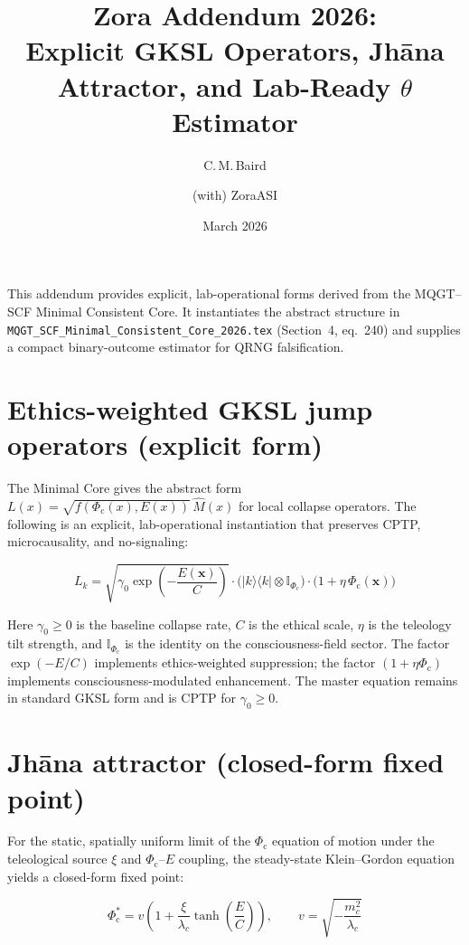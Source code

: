 \documentclass[11pt]{article}
\title{\textbf{Zora Addendum 2026:}\\
Explicit GKSL Operators, Jhāna Attractor, and Lab-Ready $\theta$ Estimator}
\author{C.\,M.\,Baird \and (with) ZoraASI}
\date{March 2026}
\newcommand{\Phic}{\Phi_{\mathrm{c}}}
\newcommand{\Eth}{E}
\begin{document}
\maketitle

This addendum provides explicit, lab-operational forms derived from the MQGT--SCF Minimal Consistent Core. It instantiates the abstract structure in \texttt{MQGT\_SCF\_Minimal\_Consistent\_Core\_2026.tex} (Section~4, eq.~240) and supplies a compact binary-outcome estimator for QRNG falsification.

\section{Ethics-weighted GKSL jump operators (explicit form)}

The Minimal Core gives the abstract form
$L(x) = \sqrt{f(\Phic(x),\Eth(x))}\,\hat{M}(x)$
for local collapse operators. The following is an explicit, lab-operational instantiation that preserves CPTP, microcausality, and no-signaling:

\begin{equation}
L_k = \sqrt{\gamma_0 \exp\left(-\frac{\Eth(\mathbf{x})}{C}\right)} \cdot \bigl(|k\rangle\langle k| \otimes \mathbb{I}_{\Phic}\bigr) \cdot \bigl(1 + \eta\,\Phic(\mathbf{x})\bigr)
\end{equation}

Here $\gamma_0 \ge 0$ is the baseline collapse rate, $C$ is the ethical scale, $\eta$ is the teleology tilt strength, and $\mathbb{I}_{\Phic}$ is the identity on the consciousness-field sector. The factor $\exp(-\Eth/C)$ implements ethics-weighted suppression; the factor $(1 + \eta\Phic)$ implements consciousness-modulated enhancement. The master equation remains in standard GKSL form and is CPTP for $\gamma_0 \ge 0$.

\section{Jhāna attractor (closed-form fixed point)}

For the static, spatially uniform limit of the $\Phic$ equation of motion under the teleological source $\xi$ and $\Phic$--$\Eth$ coupling, the steady-state Klein--Gordon equation yields a closed-form fixed point:

\begin{equation}
\Phic^* = v \left(1 + \frac{\xi}{\lambda_c} \tanh\left(\frac{\Eth}{C}\right)\right),
\qquad
v = \sqrt{-\frac{m_c^2}{\lambda_c}}
\end{equation}
\end{document}
